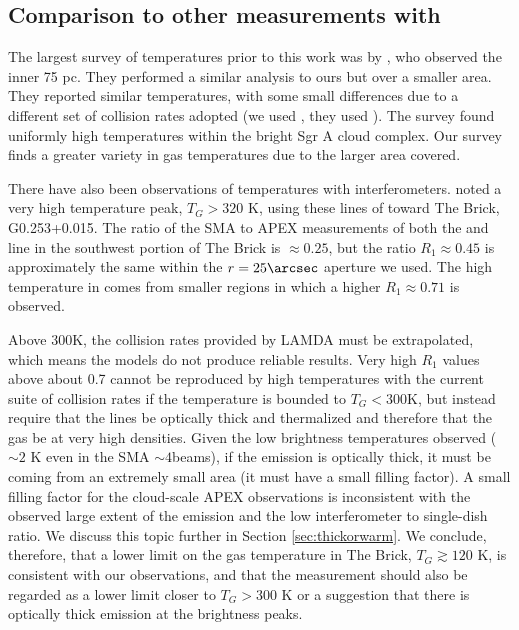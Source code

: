 \subsection{Comparison to other measurements with \para}
\label{sec:h2cocompare}
The largest survey of \para temperatures prior to this work was by
\citet{Ao2013a}, who observed the inner 75 pc.  They performed a similar
analysis to ours but over a smaller area.  They reported similar temperatures,
with some small differences due to a different set of collision rates adopted
(we used \citet{Wiesenfeld2013a}, they used \citet{Green1991a}).  The \citet{Ao2013a}
survey found uniformly high temperatures within the bright Sgr A cloud complex.
Our survey finds a greater variety in gas temperatures due to the larger area
covered.

There have also been observations of \para temperatures with interferometers.
\citet{Johnston2014a} noted a very high temperature peak, $T_G>320$ K, using these
lines of \para toward The Brick, G0.253+0.015.  The ratio of the
SMA to APEX measurements of both the \threeohthree and \threetwoone line in the
southwest portion of The Brick is $\approx0.25$, but the ratio $R_1\approx0.45$
is approximately the same within the $r=25\arcsec$ aperture we used.  The high
temperature in \citet{Johnston2014a} comes from smaller regions in which a
higher $R_1\approx0.71$ is observed.

Above 300K, the collision rates provided by LAMDA
\citep{Green1991a,Schoier2005a,Wiesenfeld2013a} must be extrapolated, which
means the models do not produce reliable results.  Very high $R_1$ values above
about 0.7 cannot be reproduced by high temperatures with the current suite of
collision rates if the temperature is bounded to $T_G<300$K, but instead require
that the lines be optically thick and thermalized and therefore that the gas be
at very high densities.   Given the low brightness temperatures observed
($\sim2$ K even in the SMA $\sim4$\arcsec beams), if the emission is optically
thick, it must be coming from an extremely small area (it must have a small
filling factor).  A small filling factor for the cloud-scale APEX observations
is inconsistent with the observed large extent of the emission and the low
interferometer to single-dish ratio.  We discuss this topic further in Section
\ref{sec:thickorwarm}.  We conclude, therefore, that a lower limit on the gas
temperature in The Brick, $T_G\gtrsim120$ K, is consistent with our observations,
and that the \citet{Johnston2014a} measurement should also be regarded as a
lower limit closer to $T_G>300$ K or a suggestion that there is optically thick
\para \threeohthree emission at the brightness peaks.



